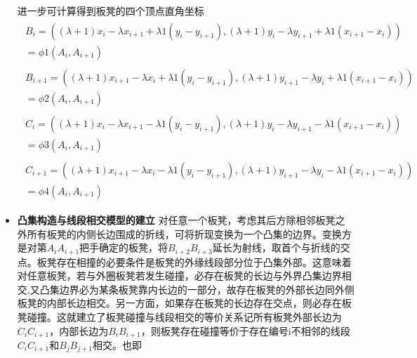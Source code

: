 \documentclass[a4paper]{article}
\begin{document}
\begin{itemize}
         进一步可计算得到板凳的四个顶点直角坐标
         \begin{equation}
         \begin{aligned}
         \begin{split}
         B_i = ((\lambda + 1) x_{i} - \lambda x_{i + 1} + \lambda 1 (y_i - y_{i + 1}), (\lambda + 1) y_{i} - \lambda y_{i + 1} + \lambda 1 (x_{i + 1} - x_i)) \\= \phi 1(A_i, A_{i + 1})
         \end{split}
         \end{aligned}
         \end{equation}
         \begin{equation}\begin{aligned}\begin{split} B_{i + 1} = ((\lambda + 1) x_{i + 1} - \lambda x_{i} + \lambda 1 (y_i - y_{i + 1}), (\lambda + 1) y_{i + 1} - \lambda y_{i} + \lambda 1 (x_{i + 1} - x_i))\\ =    \phi 2(A_i, A_{i + 1})\end{split}\end{aligned}\end{equation}
         \begin{equation}\begin{aligned}\begin{split} C_i = ((\lambda + 1) x_{i} - \lambda x_{i + 1} - \lambda 1 (y_i - y_{i + 1}), (\lambda + 1) y_{i} - \lambda y_{i + 1} - \lambda 1 (x_{i + 1} - x_i))\\ = \phi 3(A_i, A_{i + 1})\end{split}\end{aligned}\end{equation}
         \begin{equation}\begin{aligned}\begin{split} C_{i+1} = ((\lambda + 1) x_{i + 1} - \lambda x_{i} - \lambda 1 (y_i - y_{i + 1}), (\lambda + 1) y_{i + 1} - \lambda y_{i} - \lambda 1 (x_{i + 1} - x_i))\\ = \phi 4(A_i, A_{i + 1})\end{split}\end{aligned}\end{equation}
        \item {\textbf {凸集构造与线段相交模型的建立}}
          对任意一个板凳，考虑其后方除相邻板凳之外所有板凳的内侧长边围成的折线，可将折现变换为一个凸集的边界。变换方是对第$A_iA_{i+1}$把手确定的板凳，将$B_{i+2}B_{i+3}$延长为射线，取首个与折线的交点。板凳存在相撞的必要条件是板凳的外缘线段部分位于凸集外部。这意味着对任意板凳，若与外圈板凳若发生碰撞，必存在板凳的长边与外界凸集边界相交,又凸集边界必为某条板凳靠内长边的一部分，故存在板凳的外部长边同外侧板凳的内部长边相交。另一方面，如果存在板凳的长边存在交点，则必存在板凳碰撞。这就建立了板凳碰撞与线段相交的等价关系记所有板凳外部长边为$C_iC_{i + 1}$，内部长边为$B_iB_{i + 1}$，则板凳存在碰撞等价于存在编号i不相邻的线段$C_iC_{i + 1}$和$B_jB_{j + 1}$相交。也即

\end{itemize}
\end{document}
